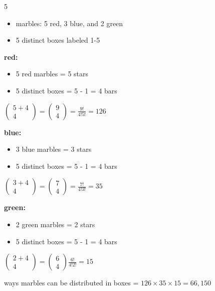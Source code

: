 \documentclass[12 pt]{article}
\begin{document}
    \begin{exercise}{5}
    \hfill

    \begin{itemize}
        \item marbles: 5 red, 3 blue, and 2 green
        \item 5 distinct boxes labeled 1-5
    \end{itemize}

    \textbf{red:} 
    \begin{itemize}
        \item 5 red marbles = 5 stars
        \item 5 distinct boxes = 5 - 1 = 4 bars
    \end{itemize}

    $\begin{pmatrix}
        5 + 4 \\
        4
    \end{pmatrix} = \begin{pmatrix}
        9 \\
        4
    \end{pmatrix} = \frac{9!}{4!5!} = 126$

    \textbf{blue:}
    \begin{itemize}
        \item 3 blue marbles = 3 stars
        \item 5 distinct boxes = 5 - 1 = 4 bars
    \end{itemize}

    $\begin{pmatrix}
        3 + 4 \\
        4
    \end{pmatrix} = \begin{pmatrix}
        7 \\
        4
    \end{pmatrix} = \frac{7!}{4!3!} = 35$

    \textbf{green:}
    \begin{itemize}
        \item 2 green marbles = 2 stars
        \item 5 distinct boxes = 5 - 1 = 4 bars
    \end{itemize}

    $\begin{pmatrix}
        2 + 4 \\
        4
    \end{pmatrix} = \begin{pmatrix}
        6 \\
        4
    \end{pmatrix} \frac{6!}{4!2!} = 15$

    ways marbles can be distributed in boxes = $126 \times 35 \times 15 = 66,150$
    \end{exercise}
\end{document}
